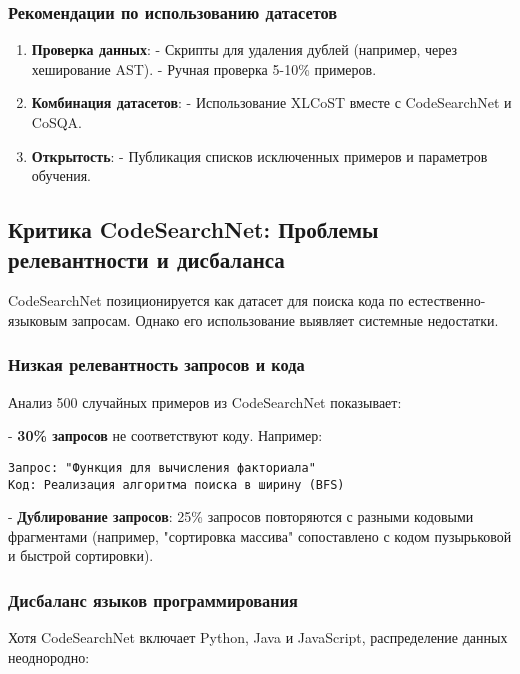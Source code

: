 \documentclass[14pt]{article}
\theoremstyle{definition}
\begin{document}
\subsubsection{Рекомендации по использованию датасетов}

\begin{enumerate}
    \item \textbf{Проверка данных}:  
      - Скрипты для удаления дублей (например, через хеширование AST).  
      - Ручная проверка 5-10\% примеров.
    \item \textbf{Комбинация датасетов}:  
      - Использование XLCoST вместе с CodeSearchNet и CoSQA.
    \item \textbf{Открытость}:  
      - Публикация списков исключенных примеров и параметров обучения.
\end{enumerate}


\newpage

\subsection{Критика CodeSearchNet: Проблемы релевантности и дисбаланса}

CodeSearchNet \cite{codesearchnet} позиционируется как датасет для поиска кода по естественно-языковым запросам. Однако его использование выявляет системные недостатки.

\subsubsection{Низкая релевантность запросов и кода}

Анализ 500 случайных примеров из CodeSearchNet \cite{codesearchnet_repo} показывает:

    
- \textbf{30\% запросов} не соответствуют коду. Например:
    \begin{verbatim}
Запрос: "Функция для вычисления факториала"
Код: Реализация алгоритма поиска в ширину (BFS)
    \end{verbatim}
    
- \textbf{Дублирование запросов}: 25\% запросов повторяются с разными кодовыми фрагментами (например, "сортировка массива" сопоставлено с кодом пузырьковой и быстрой сортировки).


\subsubsection{Дисбаланс языков программирования}

Хотя CodeSearchNet включает Python, Java и JavaScript, распределение данных неоднородно:
\end{document}
